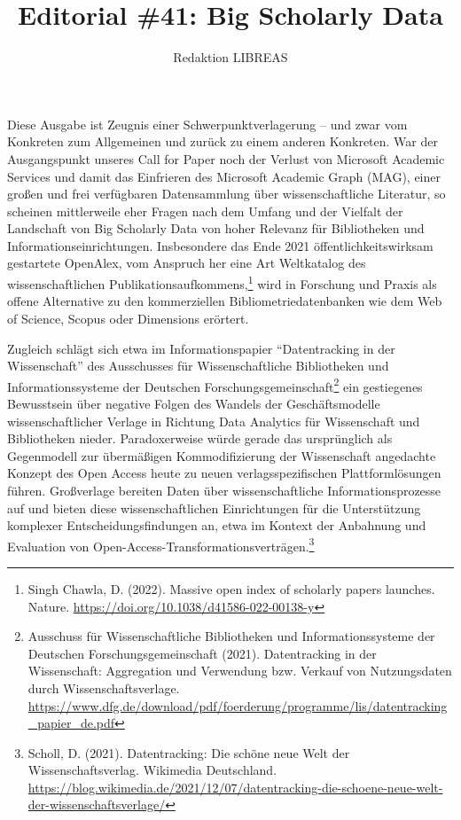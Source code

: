 \documentclass[a4paper,
fontsize=11pt,
oneside,
numbers=noperiodatend,
parskip=half-,
bibliography=totoc,
final
]{scrartcl}
\title{\LARGE{Editorial \#41: Big Scholarly Data}}%
\author{Redaktion LIBREAS} %
\date{}
\begin{document}
\maketitle
\thispagestyle{fancyplain} 


Diese Ausgabe ist Zeugnis einer Schwerpunktverlagerung -- und zwar vom
Konkreten zum Allgemeinen und zurück zu einem anderen Konkreten. War der
Ausgangspunkt unseres Call for Paper noch der Verlust von Microsoft
Academic Services und damit das Einfrieren des Microsoft Academic Graph
(MAG), einer großen und frei verfügbaren Datensammlung über
wissenschaftliche Literatur, so scheinen mittlerweile eher Fragen nach
dem Umfang und der Vielfalt der Landschaft von Big Scholarly Data von
hoher Relevanz für Bibliotheken und Informationseinrichtungen.
Insbesondere das Ende 2021 öffentlichkeitswirksam gestartete OpenAlex,
vom Anspruch her eine Art Weltkatalog des wissenschaftlichen
Publikationsaufkommens,\footnote{Singh Chawla, D. (2022). Massive open
  index of scholarly papers launches. Nature.
  \url{https://doi.org/10.1038/d41586-022-00138-y}} wird in Forschung
und Praxis als offene Alternative zu den kommerziellen
Bibliometriedatenbanken wie dem Web of Science, Scopus oder Dimensions
erörtert.

Zugleich schlägt sich etwa im Informationspapier \enquote{Datentracking
in der Wissenschaft} des Ausschusses für Wissenschaftliche Bibliotheken
und Informationssysteme der Deutschen Forschungsgemeinschaft\footnote{Ausschuss
  für Wissenschaftliche Bibliotheken und Informationssysteme der
  Deutschen Forschungsgemeinschaft (2021). Datentracking in der
  Wissenschaft: Aggregation und Verwendung bzw. Verkauf von
  Nutzungsdaten durch Wissenschaftsverlage.
  \url{https://www.dfg.de/download/pdf/foerderung/programme/lis/datentracking_papier_de.pdf}}
ein gestiegenes Bewusstsein über negative Folgen des Wandels der
Geschäftsmodelle wissenschaftlicher Verlage in Richtung Data Analytics
für Wissenschaft und Bibliotheken nieder. Paradoxerweise würde gerade
das ursprünglich als Gegenmodell zur übermäßigen Kommodifizierung der
Wissenschaft angedachte Konzept des Open Access heute zu neuen
verlagsspezifischen Plattformlösungen führen. Großverlage bereiten Daten
über wissenschaftliche Informationsprozesse auf und bieten diese
wissenschaftlichen Einrichtungen für die Unterstützung komplexer
Entscheidungsfindungen an, etwa im Kontext der Anbahnung und Evaluation
von Open-Access-Transformationsverträgen.\footnote{Scholl, D. (2021).
  Datentracking: Die schöne neue Welt der Wissenschaftsverlag. Wikimedia
  Deutschland.
  \url{https://blog.wikimedia.de/2021/12/07/datentracking-die-schoene-neue-welt-der-wissenschaftsverlage/}}
\end{document}

